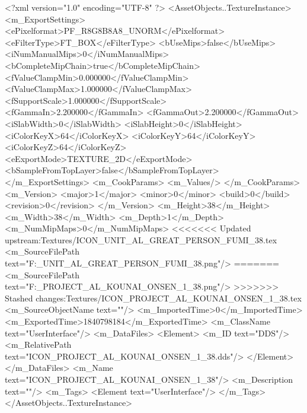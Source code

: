 <?xml version="1.0" encoding="UTF-8" ?>
<AssetObjects..TextureInstance>
	<m_ExportSettings>
		<ePixelformat>PF_R8G8B8A8_UNORM</ePixelformat>
		<eFilterType>FT_BOX</eFilterType>
		<bUseMips>false</bUseMips>
		<iNumManualMips>0</iNumManualMips>
		<bCompleteMipChain>true</bCompleteMipChain>
		<fValueClampMin>0.000000</fValueClampMin>
		<fValueClampMax>1.000000</fValueClampMax>
		<fSupportScale>1.000000</fSupportScale>
		<fGammaIn>2.200000</fGammaIn>
		<fGammaOut>2.200000</fGammaOut>
		<iSlabWidth>0</iSlabWidth>
		<iSlabHeight>0</iSlabHeight>
		<iColorKeyX>64</iColorKeyX>
		<iColorKeyY>64</iColorKeyY>
		<iColorKeyZ>64</iColorKeyZ>
		<eExportMode>TEXTURE_2D</eExportMode>
		<bSampleFromTopLayer>false</bSampleFromTopLayer>
	</m_ExportSettings>
	<m_CookParams>
		<m_Values/>
	</m_CookParams>
	<m_Version>
		<major>1</major>
		<minor>0</minor>
		<build>0</build>
		<revision>0</revision>
	</m_Version>
	<m_Height>38</m_Height>
	<m_Width>38</m_Width>
	<m_Depth>1</m_Depth>
	<m_NumMipMaps>0</m_NumMipMaps>
<<<<<<< Updated upstream:Textures/ICON_UNIT_AL_GREAT_PERSON_FUMI_38.tex
	<m_SourceFilePath text="F:\DT\lilyimages\gpportrait\ICON_UNIT_AL_GREAT_PERSON_FUMI_38.png"/>
=======
	<m_SourceFilePath text="F:\DT\lilyimages\projects\ICON_PROJECT_AL_KOUNAI_ONSEN_1_38.png"/>
>>>>>>> Stashed changes:Textures/ICON_PROJECT_AL_KOUNAI_ONSEN_1_38.tex
	<m_SourceObjectName text=""/>
	<m_ImportedTime>0</m_ImportedTime>
	<m_ExportedTime>1840798184</m_ExportedTime>
	<m_ClassName text="UserInterface"/>
	<m_DataFiles>
		<Element>
			<m_ID text="DDS"/>
			<m_RelativePath text="ICON_PROJECT_AL_KOUNAI_ONSEN_1_38.dds"/>
		</Element>
	</m_DataFiles>
	<m_Name text="ICON_PROJECT_AL_KOUNAI_ONSEN_1_38"/>
	<m_Description text=""/>
	<m_Tags>
		<Element text="UserInterface"/>
	</m_Tags>
</AssetObjects..TextureInstance>

